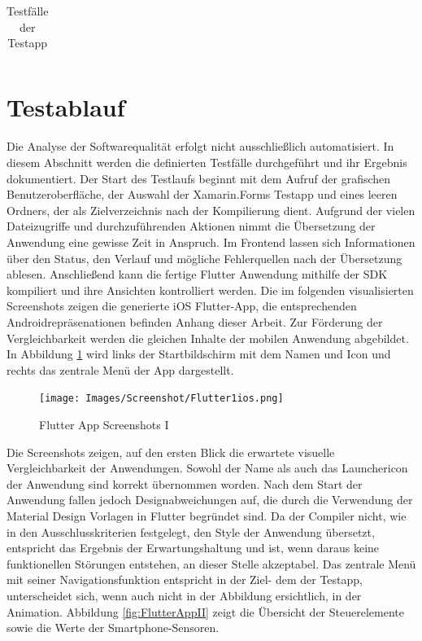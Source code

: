 \begin{xltabular}{\textwidth}{|l|X|}
	  \caption{Testfälle der Testapp}

 \label{tab:Testapp}
\end{xltabular}


\section{Testablauf}
Die Analyse der Softwarequalität erfolgt nicht ausschließlich automatisiert.  In diesem Abschnitt werden die definierten Testfälle durchgeführt und ihr Ergebnis dokumentiert.
Der Start  des Testlaufs beginnt mit dem Aufruf der grafischen Benutzeroberfläche,   der Auswahl der Xamarin.Forms Testapp und eines leeren Ordners, der als Zielverzeichnis nach der Kompilierung dient. 
Aufgrund der vielen Dateizugriffe und durchzuführenden Aktionen nimmt die Übersetzung der Anwendung eine gewisse Zeit in Anspruch. Im Frontend lassen sich Informationen über den Status, den Verlauf und mögliche Fehlerquellen nach der Übersetzung ablesen.  Anschließend kann die fertige Flutter Anwendung mithilfe der SDK kompiliert und ihre Ansichten kontrolliert werden.  Die im folgenden visualisierten Screenshots zeigen die generierte iOS Flutter-App,  die entsprechenden Androidrepräsenationen befinden Anhang dieser Arbeit.  Zur Förderung der Vergleichbarkeit werden die gleichen Inhalte der mobilen Anwendung abgebildet.  In Abbildung \ref{fig:FlutterAppI} wird links der Startbildschirm mit dem Namen und Icon und rechts das zentrale Menü der App dargestellt. 

\begin{figure}[!ht]
 \texttt{[image: Images/Screenshot/Flutter1ios.png]}
 \caption{Flutter App Screenshots I}
 \label{fig:FlutterAppI}
\end{figure}

Die Screenshots zeigen,  auf den ersten Blick die erwartete visuelle Vergleichbarkeit der Anwendungen.  Sowohl der Name als auch das Launchericon der Anwendung sind korrekt übernommen worden.  Nach dem Start der Anwendung fallen jedoch Designabweichungen auf, die durch die Verwendung der Material Design Vorlagen in Flutter begründet sind. Da der Compiler nicht,  wie in den Ausschlusskriterien festgelegt, den Style der Anwendung übersetzt,  entspricht das Ergebnis der Erwartungshaltung und ist, wenn daraus keine funktionellen Störungen 
entstehen,  an dieser Stelle akzeptabel.  Das zentrale Menü mit seiner Navigationsfunktion entspricht in der Ziel- dem der Testapp,  
unterscheidet sich, wenn auch nicht in der Abbildung ersichtlich,  in der Animation.  Abbildung \ref{fig:FlutterAppII} zeigt die Übersicht der Steuerelemente sowie die Werte der Smartphone-Sensoren.

